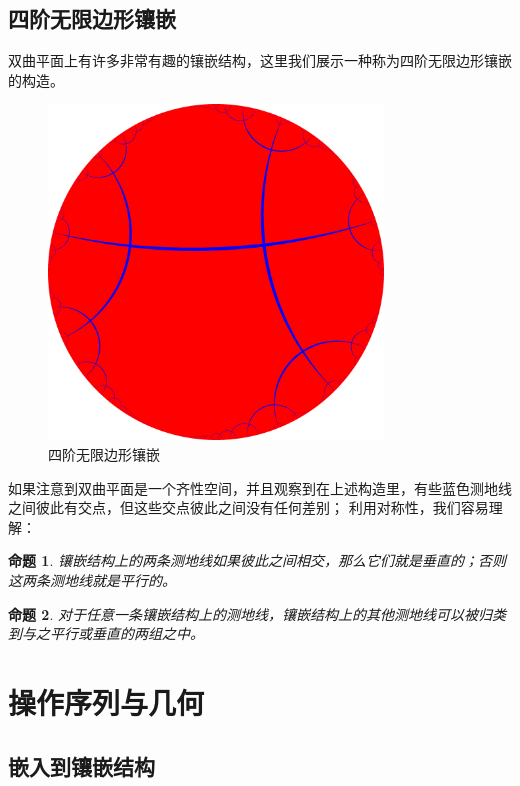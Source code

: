 \documentclass[a4paper,12pt]{article}
\newtheorem{proposition}{命题}
\begin{document}
\newpage

\subsection{四阶无限边形镶嵌}

双曲平面上有许多非常有趣的镶嵌结构，这里我们展示一种称为四阶无限边形镶嵌的构造。

\begin{figure}[ht]
\centering
\includegraphics[width=3.5in]{images/H2_tiling_24i-1.png}
\caption{四阶无限边形镶嵌}
\end{figure}

如果注意到双曲平面是一个齐性空间，并且观察到在上述构造里，有些蓝色测地线之间彼此有交点，但这些交点彼此之间没有任何差别；
利用对称性，我们容易理解：

\begin{proposition}
\label{A}
镶嵌结构上的两条测地线如果彼此之间相交，那么它们就是垂直的；否则这两条测地线就是平行的。
\end{proposition}

\begin{proposition}
\label{B}
对于任意一条镶嵌结构上的测地线，镶嵌结构上的其他测地线可以被归类到与之平行或垂直的两组之中。
\end{proposition}

\newpage

\section{操作序列与几何}

\subsection{嵌入到镶嵌结构}
\end{document}
